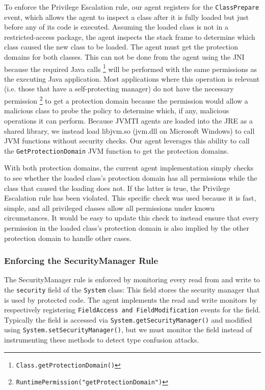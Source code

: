 \documentclass{sig-alternate}
\begin{document}
To enforce the Privilege Escalation rule, our agent registers for
the \texttt{ClassPrepare} event, which allows the agent to inspect
a class after it is fully loaded but just before any of its code is
executed. Assuming the loaded class is not in a restricted-access
package, the agent inspects the stack frame to determine which class
caused the new class to be loaded. The agent must get the protection
domains for both classes. This can not be done from the agent using
the JNI because the required Java calls%
\footnote{\texttt{Class.getProtectionDomain()}%
} will be performed with the same permissions as the executing Java
application. Most applications where this operation is relevant (i.e.
those that have a self-protecting manager) do not have the necessary
permission%
\footnote{\texttt{RuntimePermission("getProtectionDomain")}%
} to get a protection domain because the permission would allow a malicious
class to probe the policy to determine which, if any, malicious operations
it can perform. Because JVMTI agents are loaded into the JRE as a
shared library, we instead load libjvm.so (jvm.dll on Microsoft Windows)
to call JVM functions without security checks. Our agent leverages
this ability to call the \texttt{GetProtectionDomain} JVM function
to get the protection domains. 

With both protection domains, the current agent implementation simply
checks to see whether the loaded class's protection domain has all
permissions while the class that caused the loading does not. If the
latter is true, the Privilege Escalation rule has been violated. This
specific check was used because it is fast, simple, and all privileged
classes allow all permissions under known circumstances. It would
be easy to update this check to instead ensure that every permission
in the loaded class's protection domain is also implied by the other
protection domain to handle other cases.


\subsubsection{Enforcing the SecurityManager Rule}\label{sub:Enforcing-the-SecurityManager}

The SecurityManager rule is enforced by monitoring every read from
and write to the \texttt{security} field of the \texttt{System} class:
This field stores the security manager that is used by protected code.
The agent implements the read and write monitors by respectively registering
\texttt{FieldAccess and FieldModification} events for the field. Typically
the field is accessed via \texttt{System.getSecurityManager()}
and modified using \texttt{System.setSecurityManager()}, but we must
monitor the field instead of instrumenting these methods to detect
type confusion attacks. 
\end{document}
